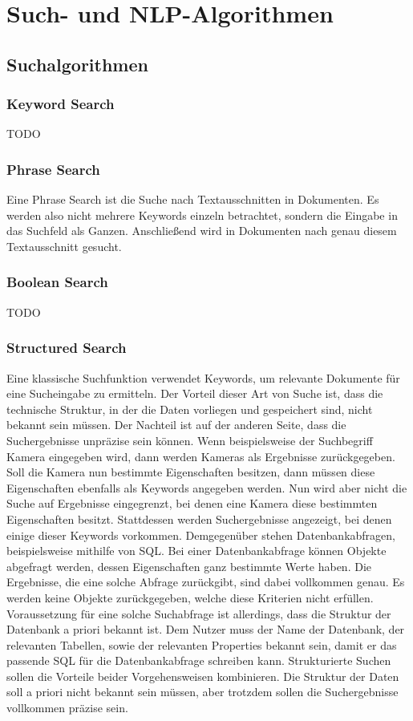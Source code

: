 \chapter{Such- und NLP-Algorithmen}

\section{Suchalgorithmen}

\subsection{Keyword Search}
TODO

\subsection{Phrase Search}
Eine Phrase Search ist die Suche nach Textausschnitten in Dokumenten. Es werden also nicht mehrere Keywords einzeln betrachtet, sondern die Eingabe in das Suchfeld als Ganzen. Anschließend wird in Dokumenten nach genau diesem Textausschnitt gesucht.

\subsection{Boolean Search}
TODO

\subsection{Structured Search}
Eine klassische Suchfunktion verwendet Keywords, um relevante Dokumente für eine Sucheingabe zu ermitteln. Der Vorteil dieser Art von Suche ist, dass die technische Struktur, in der die Daten vorliegen und gespeichert sind, nicht bekannt sein müssen. Der Nachteil ist auf der anderen Seite, dass die Suchergebnisse unpräzise sein können. Wenn beispielsweise der Suchbegriff Kamera eingegeben wird, dann werden Kameras als Ergebnisse zurückgegeben. Soll die Kamera nun bestimmte Eigenschaften besitzen, dann müssen diese Eigenschaften ebenfalls als Keywords angegeben werden. Nun wird aber nicht die Suche auf Ergebnisse eingegrenzt, bei denen eine Kamera diese bestimmten Eigenschaften besitzt. Stattdessen werden Suchergebnisse angezeigt, bei denen einige dieser Keywords vorkommen.
Demgegenüber stehen Datenbankabfragen, beispielsweise mithilfe von SQL. Bei einer Datenbankabfrage können Objekte abgefragt werden, dessen Eigenschaften ganz bestimmte Werte haben. Die Ergebnisse, die eine solche Abfrage zurückgibt, sind dabei vollkommen genau. Es werden keine Objekte zurückgegeben, welche diese Kriterien nicht erfüllen. Voraussetzung für eine solche Suchabfrage ist allerdings, dass die Struktur der Datenbank a priori bekannt ist. Dem Nutzer muss der Name der Datenbank, der relevanten Tabellen, sowie der relevanten Properties bekannt sein, damit er das passende SQL für die Datenbankabfrage schreiben kann.
Strukturierte Suchen sollen die Vorteile beider Vorgehensweisen kombinieren. Die Struktur der Daten soll a priori nicht bekannt sein müssen, aber trotzdem sollen die Suchergebnisse vollkommen präzise sein. 

